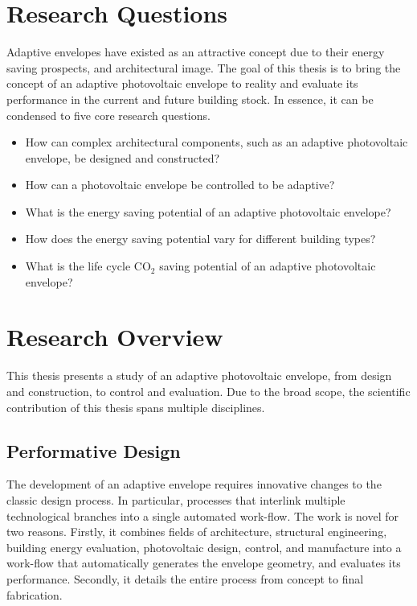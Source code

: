 \section{Research Questions}

Adaptive envelopes have existed as an attractive concept due to their energy saving prospects, and architectural image. The goal of this thesis is to bring the concept of an adaptive photovoltaic envelope to reality and evaluate its performance in the current and future building stock. In essence, it can be condensed to five core research questions.

\begin{itemize}
\item How can complex architectural components, such as an adaptive photovoltaic envelope, be designed and constructed? 
\item How can a photovoltaic envelope be controlled to be adaptive?
\item What is the energy saving potential of an adaptive photovoltaic envelope?
\item How does the energy saving potential vary for different building types?
\item What is the life cycle CO$_2$ saving potential of an adaptive photovoltaic envelope?

\end{itemize}


\section{Research Overview}

This thesis presents a study of an adaptive photovoltaic envelope, from design and construction, to control and evaluation. Due to the broad scope, the scientific contribution of this thesis spans multiple disciplines. 

\subsection{Performative Design}
The development of an adaptive envelope requires innovative changes to the classic design process. In particular, processes that interlink multiple technological branches into a single automated work-flow. The work is novel for two reasons. Firstly, it combines fields of architecture, structural engineering, building energy evaluation, photovoltaic design, control, and manufacture into a work-flow that automatically generates the envelope geometry, and evaluates its performance. Secondly, it details the entire process from concept to final fabrication. 


